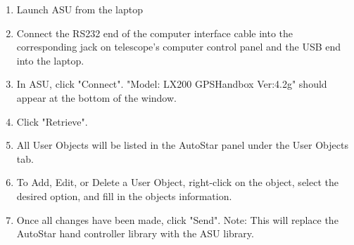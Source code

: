 \documentclass[12pt,titlepage]{article}
\begin{document}
\begin{enumerate}
	\item Launch ASU from the laptop
	\item Connect the RS232 end of the computer interface cable into the corresponding jack on telescope's computer control panel and the USB end into the laptop.
	\item In ASU, click "Connect". "Model: LX200 GPS\quad Handbox Ver:4.2g" should appear at the bottom of the window.
	\item Click "Retrieve".
	\item All User Objects will be listed in the AutoStar panel under the User Objects tab.
	\item To Add, Edit, or Delete a User Object, right-click on the object, select the desired option, and fill in the objects information.
	\item Once all changes have been made, click "Send". Note: This will replace the AutoStar hand controller library with the ASU library.
\end{enumerate}
\end{document}
